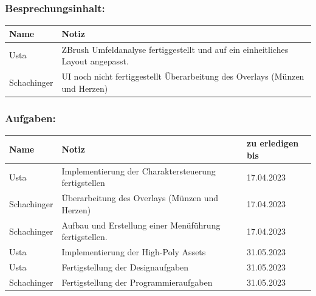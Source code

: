\subsubsection*{Besprechungsinhalt:}
\begin{tabular}{|m{}|m{}|}
\hline
Name & Notiz \\
\hline
Usta & ZBrush Umfeldanalyse fertiggestellt und auf ein einheitliches Layout angepasst. \\
\hline
Schachinger & UI noch nicht fertiggestellt Überarbeitung des Overlays (Münzen und Herzen) \\
\hline
\end{tabular}

\subsubsection*{Aufgaben:}
\begin{tabular}{|m{}|m{}|m{}|}
\hline
Name & Notiz & zu erledigen bis \\
\hline
Usta & Implementierung der Charaktersteuerung fertigstellen & 17.04.2023 \\
\hline
Schachinger & Überarbeitung des Overlays (Münzen und Herzen) & 17.04.2023 \\
\hline
Schachinger & Aufbau und Erstellung einer Menüführung fertigstellen. & 17.04.2023 \\
\hline
Usta & Implementierung der High-Poly Assets & 31.05.2023 \\
\hline
Usta & Fertigstellung der Designaufgaben & 31.05.2023 \\
\hline
Schachinger & Fertigstellung der Programmieraufgaben & 31.05.2023 \\
\hline
\end{tabular}


\pagebreak

